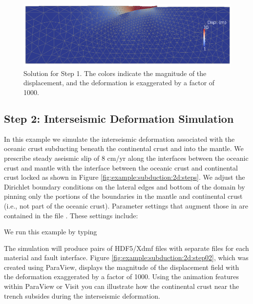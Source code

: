 \begin{figure}
  \includegraphics[width=4.5in]{examples/figs/subduction2d_step01_soln}
  \caption{Solution for Step 1. The colors indicate the magnitude of the displacement,
    and the deformation is exaggerated by a factor of 1000. }
  \label{fig:example:subduction:2d:step01}
\end{figure}


\subsection{Step 2: Interseismic Deformation Simulation}

In this example we simulate the interseismic deformation associated
with the oceanic crust subducting beneath the continental crust and
into the mantle. We prescribe steady aseismic slip of 8 cm/yr along
the interfaces between the oceanic crust and mantle with the interface
between the oceanic crust and continental crust locked as shown in
Figure \vref{fig:example:subduction:2d:steps}. We adjust the Dirichlet
boundary conditions on the lateral edges and bottom of the domain
by pinning only the portions of the boundaries in the mantle and continental
crust (i.e., not part of the oceanic crust). Parameter settings that
augment those in  are contained in the file
. These settings include:
\begin{inventory}
\end{inventory}
We run this example by typing
The simulation will produce pairs of HDF5/Xdmf files with separate
files for each material and fault interface. Figure
\vref{fig:example:subduction:2d:step02}, which was created using
ParaView, displays the magnitude of the displacement field with the
deformation exaggerated by a factor of 1000. Using the animation
features within ParaView or Visit you can illustrate how the
continental crust near the trench subsides during the interseismic
deformation.

